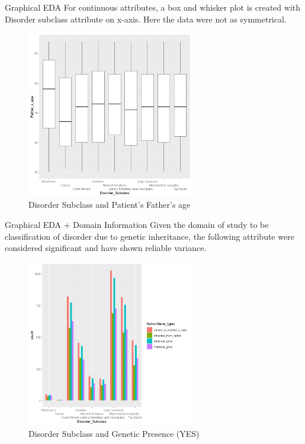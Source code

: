 \documentclass{beamer}
\begin{document}
\begin{frame}{Graphical EDA}
	For continuous attributes, a box and whisker plot is created with Disorder subclass attribute on x-axis. Here the data were not as symmetrical.
	
	\begin{figure}
		\includegraphics[width=0.65\textwidth, height=0.6\textheight]{f-age.png}
		\caption{Disorder Subclass and Patient's Father's age}
	\end{figure}
\end{frame}

\begin{frame}{Graphical EDA + Domain Information}
	Given the domain of study to be classification of disorder due to genetic inheritance, the following attribute were considered significant and have shown reliable variance.
	
	\begin{figure}
		\includegraphics[width=0.65\textwidth, height=0.6\textheight]{gy.png}
		\caption{Disorder Subclass and Genetic Presence (YES)}
	\end{figure}
\end{frame}
\end{document}
